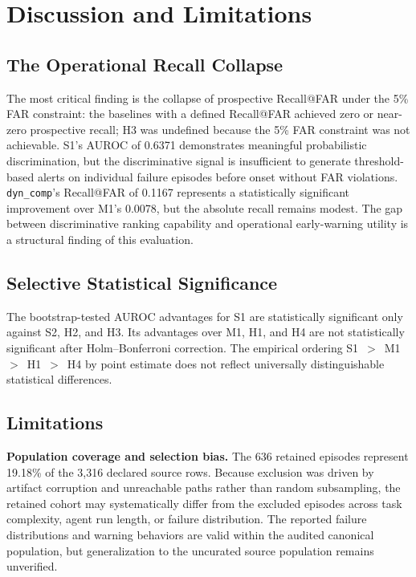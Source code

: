 \documentclass[conference,letterpaper]{IEEEtran}
\begin{document}
\section{Discussion and Limitations}

\subsection{The Operational Recall Collapse}

The most critical finding is the collapse of prospective Recall@FAR
under the 5\% FAR constraint: the baselines with a defined Recall@FAR
achieved zero or near-zero prospective recall; H3 was undefined because
the 5\% FAR constraint was not achievable. S1's AUROC of 0.6371
demonstrates meaningful probabilistic discrimination, but the
discriminative signal is insufficient to generate threshold-based
alerts on individual failure episodes before onset without FAR
violations. \texttt{dyn\_comp}'s Recall@FAR of 0.1167
represents a statistically significant improvement over M1's 0.0078, but
the absolute recall remains modest. The gap between discriminative
ranking capability and operational early-warning utility is a structural
finding of this evaluation.

\subsection{Selective Statistical Significance}

The bootstrap-tested AUROC advantages for S1 are statistically
significant only against S2, H2, and H3.
Its advantages over M1, H1, and H4 are not statistically significant
after Holm--Bonferroni correction. The empirical ordering
S1~$>$~M1~$>$~H1~$>$~H4 by point estimate does not reflect universally
distinguishable statistical differences.

\subsection{Limitations}

\textbf{Population coverage and selection bias.} The 636 retained
episodes represent 19.18\% of the 3{,}316 declared source rows. Because
exclusion was driven by artifact corruption and unreachable paths
rather than random subsampling, the retained cohort may systematically
differ from the excluded episodes across task complexity, agent run
length, or failure distribution. The reported failure distributions and
warning behaviors are valid within the audited canonical population,
but generalization to the uncurated source population remains
unverified.
\end{document}
